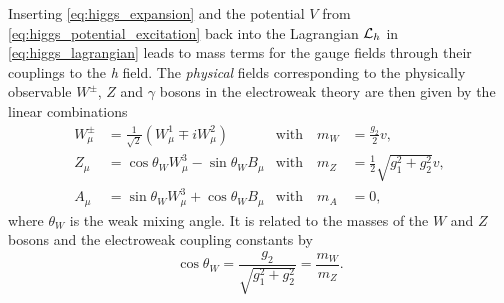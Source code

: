 Inserting \cref{eq:higgs_expansion} and the potential $V$ from \cref{eq:higgs_potential_excitation} back into the Lagrangian $\mathcal{L}_h$ in \cref{eq:higgs_lagrangian} leads to mass terms for the gauge fields through their couplings to the \textit{h} field. The \textit{physical} fields corresponding to the physically observable $W^\pm$, $Z$ and $\gamma$ bosons in the electroweak theory are then given by the linear combinations
\begin{align*}
	W^\pm_\mu 	& = \frac{1}{\sqrt{2}}(W^1_\mu\mp i W^2_\mu) 				& \textrm{with} \quad m_W  & = \frac{g_2}{2}v, \\
	Z_\mu 		& = \cos\theta_W W_\mu^3 - \sin\theta_W B_\mu 	& \textrm{with} \quad m_Z  & = \frac{1}{2}\sqrt{g_1^2+g_2^2}v, \\
	A_\mu 		& = \sin\theta_W W_\mu^3 + \cos\theta_W B_\mu 	& \textrm{with} \quad m_A  & = 0,
\end{align*}
where $\theta_W$ is the weak mixing angle. It is related to the masses of the $W$ and $Z$ bosons and the electroweak coupling constants by
\begin{equation}
	\cos{\theta_W} = \frac{g_2}{\sqrt{g_1^2 + g_2^2}} = \frac{m_W}{m_Z}.
\end{equation} 


